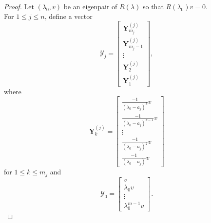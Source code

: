 \documentclass[12pt, reqno]{amsart}
\theoremstyle{definition}
\theoremstyle{remark}
\numberwithin{equation}{section}
\begin{document}
\begin{proof}
Let $(\lambda_0,v)$ be an eigenpair of $R(\lambda)$ so that $R(\lambda_0)v = 0$.  \\
For $1 \leq j \leq n$, define a vector 
\[
\mathcal{Y}_j = \begin{bmatrix}
    \textbf{Y}_{m_j}^{(j)} \\
    \textbf{Y}_{m_j -1}^{(j)} \\
    \vdots \\
    \textbf{Y}_{2}^{(j)} \\
    \textbf{Y}_{1}^{(j)}
\end{bmatrix},
\]
where 
\[
\textbf{Y}_k^{(j)} = \begin{bmatrix}
    \frac{-1}{(\lambda_0-a_j)^k} v\\
    \frac{-1}{(\lambda_0-a_j)^{k-1}} v\\
    \vdots\\
    \frac{-1}{(\lambda_0-a_j)^2}v\\
    \frac{-1}{(\lambda_0-a_j)}v
\end{bmatrix}
\]
for $1 \leq k \leq m_j$ and 
\[
\mathcal{Y}_0 = \begin{bmatrix}
    v\\
    \lambda_0v\\
    \vdots\\
    \lambda_0^{m-1}v
\end{bmatrix}.
\]


\end{proof}
\end{document}
